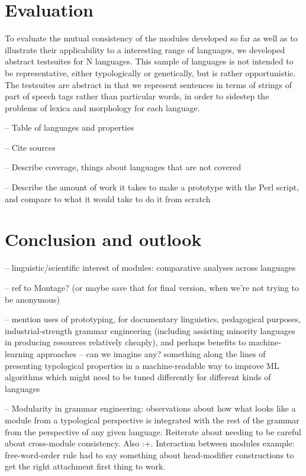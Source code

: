 \documentclass[11pt]{article}
\begin{document}
\section{Evaluation}

To evaluate the mutual consistency of the modules developed so far as
well as to illustrate their applicability to a interesting range of
languages, we developed abstract testsuites for N languages.  This
sample of languages is not intended to be representative, either
typologically or genetically, but is rather opportunistic.  The
testsuites are abstract in that we represent sentences in terms of
strings of part of speech tags rather than particular words, in order
to sidestep the problems of lexica and morphology for each language.

-- Table of languages and properties

-- Cite sources

-- Describe coverage, things about languages that are not covered

-- Describe the amount of work it takes to make a prototype with the
Perl script, and compare to what it would take to do it from scratch

\section{Conclusion and outlook}

-- linguistic/scientific interest of modules: comparative analyses
across languages

-- ref to Montage? (or maybe save that for final version, when 
we're not trying to be anonymous)

-- mention uses of prototyping, for documentary linguistics, pedagogical
purposes, industrial-strength grammar engineering (including assisting
minority languages in producing resources relatively cheaply), and perhaps
benefits to machine-learning approaches -- can we imagine any?  something
along the lines of presenting typological properties in a machine-readable
way to improve ML algorithms which might need to be tuned differently for
different kinds of languages

-- Modularity in grammar engineering: observations about how what looks
like a module from a typological perspective is integrated with the rest
of the grammar from the perspective of any given language. Reiterate about
needing to be careful about cross-module consistency. Also :+. Interaction
between modules example: free-word-order rule had to say something about
head-modifier constructions to get the right attachment first thing to work.
\end{document}
